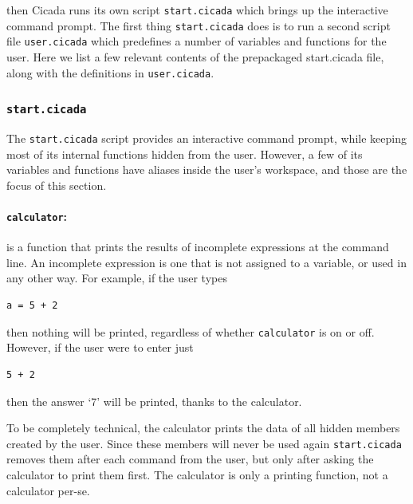 \documentclass{article}
\newenvironment{code}{
       \begin{list}{}{
               \setlength{\leftmargin}{.4in}
               \setlength{\rightmargin}{0in}
               \setlength{\topsep}{.2in}
       }
       \small
       \item[] }
       { \end{list}   }
\begin{document}
\noindent then Cicada runs its own script \verb#start.cicada# which brings up the interactive command prompt.  The first thing \verb#start.cicada# does is to run a second script file \verb#user.cicada# which predefines a number of variables and functions for the user.  Here we list a few relevant contents of the prepackaged start.cicada file, along with the definitions in \verb#user.cicada#.




\subsubsection{\texttt{start.cicada}}

The \verb#start.cicada# script provides an interactive command prompt, while keeping most of its internal functions hidden from the user.  However, a few of its variables and functions have aliases inside the user's workspace, and those are the focus of this section.\\


\paragraph{\texttt{calculator}:} is a function that prints the results of incomplete expressions at the command line.  An incomplete expression is one that is not assigned to a variable, or used in any other way.  For example, if the user types

\begin{code} \begin{verbatim}
a = 5 + 2
\end{verbatim} \end{code}

\noindent then nothing will be printed, regardless of whether \texttt{calculator} is on or off.  However, if the user were to enter just

\begin{code} \begin{verbatim}
5 + 2
\end{verbatim} \end{code}

\noindent then the answer `7' will be printed, thanks to the calculator.

To be completely technical, the calculator prints the data of all hidden members created by the user.  Since these members will never be used again \verb#start.cicada# removes them after each command from the user, but only after asking the calculator to print them first.  The calculator is only a printing function, not a calculator per-se.
\end{document}
